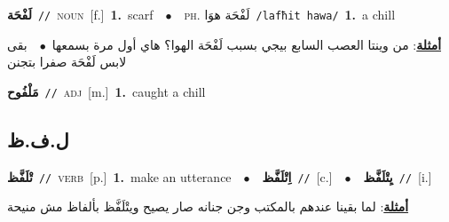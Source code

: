 \documentclass[10pt,a4paper,twoside]{article} %
\begin{document}
\begin{multicols}{2}
{\setlength\topsep{0pt}\textbf{\foreignlanguage{arabic}{لَفْحَة}}\ {\color{gray}\texttt{//}\color{black}}\ \textsc{noun}\ [f.]\ \textbf{1.}~scarf\ \ $\bullet$\ \ \textsc{ph.} \color{gray} \foreignlanguage{arabic}{لَفْحَة هوَا}\color{black}\ {\color{gray}\texttt{/{\sffamily lafħit hawa}/}\color{black}}\ \textbf{1.}~a chill\  \begin{flushright}\color{gray}\foreignlanguage{arabic}{\textbf{\underline{\foreignlanguage{arabic}{أمثلة}}}: من وينتا العصب السابع بيجي بسبب لَفْحَة الهوا؟ هاي أول مرة بسمعها\ $\bullet$\ \  بقى لابس لَفْحَة صفرا بتجنن}\end{flushright}\color{black}} \vspace{2mm}

{\setlength\topsep{0pt}\textbf{\foreignlanguage{arabic}{مَلْفُوح}}\ {\color{gray}\texttt{//}\color{black}}\ \textsc{adj}\ [m.]\ \textbf{1.}~caught a chill\ } \vspace{2mm}

\vspace{-3mm}
\subsection*{\color{blue}\foreignlanguage{arabic}{ل.ف.ظ}\color{blue}{}} 

{\setlength\topsep{0pt}\textbf{\foreignlanguage{arabic}{تْلَفَّظ}}\ {\color{gray}\texttt{//}\color{black}}\ \textsc{verb}\ [p.]\ \textbf{1.}~make an utterance\ \ $\bullet$\ \ \setlength\topsep{0pt}\textbf{\foreignlanguage{arabic}{اِتْلَفَّظ}}\ {\color{gray}\texttt{//}\color{black}}\ [c.]\ \ $\bullet$\ \ \setlength\topsep{0pt}\textbf{\foreignlanguage{arabic}{يِتْلَفَّظ}}\ {\color{gray}\texttt{//}\color{black}}\ [i.]\  \begin{flushright}\color{gray}\foreignlanguage{arabic}{\textbf{\underline{\foreignlanguage{arabic}{أمثلة}}}: لما بقينا عندهم بالمكتب وجن جنانه صار يصيح ويتْلَفَّظ بألفاظ مش منيحة}\end{flushright}\color{black}} \vspace{2mm}


\end{multicols}
\end{document}
